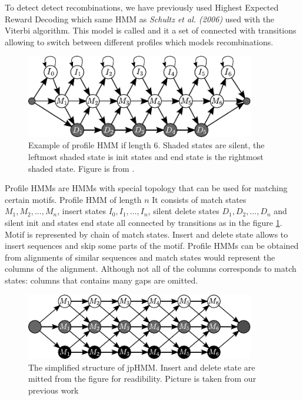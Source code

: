 To detect detect recombinations, we have previously used Highest Expected Reward
Decoding \cite{Nanasi2010mgr, Nanasi2010} which same HMM as {\it Schultz et al.
(2006)}\nocite{Schultz2006} used with the Viterbi algorithm. This model is
called  and it a set of \cite{Durbin1998} connected with transitions allowing to
switch between different profiles which models recombinations. 

\begin{figure}
\begin{center}
\includegraphics[width=10cm]{../figures/profile_hmm}
\end{center}
\caption[Profile HMM]{Example of profile HMM if length $6$. Shaded states are
silent, the leftmost shaded state is init states and end state is the rightmost
shaded state. Figure is from \cite{Nanasi2010mgr}.}\label{FIGURE:PROFILEHMM}
\end{figure}

Profile HMMs are HMMs with special topology that can be used for matching
certain motifs. Profile HMM of length $n$ It consists of match states
$M_1,M_2,\dots, M_n$, insert states $I_0, I_1, \dots, I_n$, silent delete states
$D_1, D_2,\dots, D_n$ and silent init and states end state all connected by
transitions as in the figure \ref{FIGURE:PROFILEHMM}. Motif is represented by
chain of match states. Insert and delete state allows to insert sequences and
skip some parts of the motif. Profile HMMs can be obtained from alignments of
similar sequences and match states would represent the columns of the alignment.
Although not all of the columns corresponds to match states: columns that
contains many gaps are omitted.

\begin{figure}
\begin{center}
\includegraphics[width=10cm]{../figures/jumping_hmm}
\end{center}
\caption[Jumping HMM]{The simplified structure of jpHMM. Insert and delete state
are mitted from the figure for readibility. Picture is taken from our previous
work \cite{Nanasi2010mgr}}\label{app:fig:jpHMM}
\end{figure}

